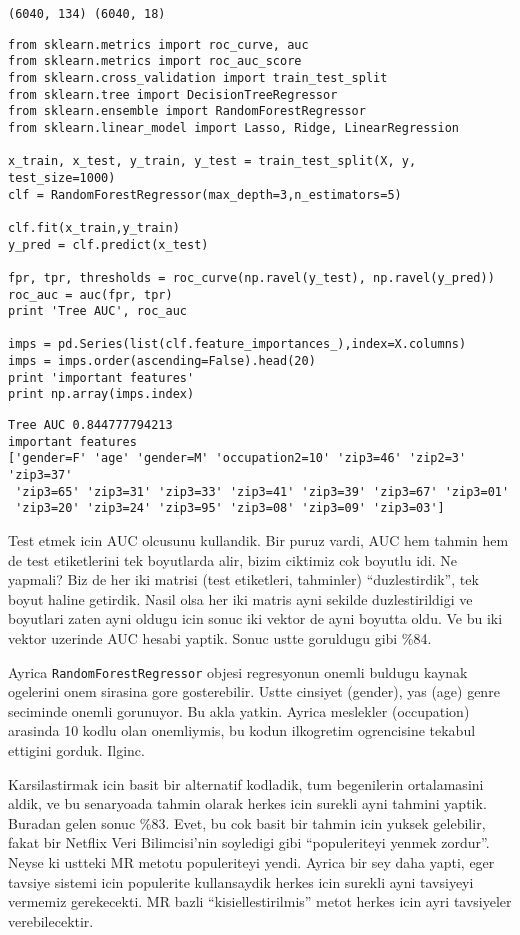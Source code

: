 \documentclass[12pt,fleqn]{article}\usepackage{../common}
\begin{document}
\begin{verbatim}
(6040, 134) (6040, 18)
\end{verbatim}

\begin{verbatim}
from sklearn.metrics import roc_curve, auc
from sklearn.metrics import roc_auc_score
from sklearn.cross_validation import train_test_split
from sklearn.tree import DecisionTreeRegressor
from sklearn.ensemble import RandomForestRegressor
from sklearn.linear_model import Lasso, Ridge, LinearRegression

x_train, x_test, y_train, y_test = train_test_split(X, y, test_size=1000)
clf = RandomForestRegressor(max_depth=3,n_estimators=5)

clf.fit(x_train,y_train)
y_pred = clf.predict(x_test)

fpr, tpr, thresholds = roc_curve(np.ravel(y_test), np.ravel(y_pred))
roc_auc = auc(fpr, tpr)
print 'Tree AUC', roc_auc

imps = pd.Series(list(clf.feature_importances_),index=X.columns)
imps = imps.order(ascending=False).head(20)
print 'important features'
print np.array(imps.index)
\end{verbatim}

\begin{verbatim}
Tree AUC 0.844777794213
important features
['gender=F' 'age' 'gender=M' 'occupation2=10' 'zip3=46' 'zip2=3' 'zip3=37'
 'zip3=65' 'zip3=31' 'zip3=33' 'zip3=41' 'zip3=39' 'zip3=67' 'zip3=01'
 'zip3=20' 'zip3=24' 'zip3=95' 'zip3=08' 'zip3=09' 'zip3=03']
\end{verbatim}

Test etmek icin AUC olcusunu kullandik. Bir puruz vardi, AUC hem tahmin hem
de test etiketlerini tek boyutlarda alir, bizim ciktimiz cok boyutlu
idi. Ne yapmali?  Biz de her iki matrisi (test etiketleri, tahminler)
``duzlestirdik'', tek boyut haline getirdik. Nasil olsa her iki matris ayni
sekilde duzlestirildigi ve boyutlari zaten ayni oldugu icin sonuc iki
vektor de ayni boyutta oldu. Ve bu iki vektor uzerinde AUC hesabi
yaptik. Sonuc ustte goruldugu gibi \%84.

Ayrica \verb!RandomForestRegressor! objesi regresyonun onemli buldugu
kaynak ogelerini onem sirasina gore gosterebilir. Ustte cinsiyet (gender),
yas (age) genre seciminde onemli gorunuyor. Bu akla yatkin. Ayrica
meslekler (occupation) arasinda 10 kodlu olan onemliymis, bu kodun
ilkogretim ogrencisine tekabul ettigini gorduk. Ilginc.

Karsilastirmak icin basit bir alternatif kodladik, tum begenilerin
ortalamasini aldik, ve bu senaryoada tahmin olarak herkes icin surekli ayni
tahmini yaptik. Buradan gelen sonuc \%83. Evet, bu cok basit bir tahmin
icin yuksek gelebilir, fakat bir Netflix Veri Bilimcisi'nin soyledigi gibi
``populeriteyi yenmek zordur''. Neyse ki ustteki MR metotu populeriteyi
yendi. Ayrica bir sey daha yapti, eger tavsiye sistemi icin populerite
kullansaydik herkes icin surekli ayni tavsiyeyi vermemiz gerekecekti. MR
bazli ``kisiellestirilmis'' metot herkes icin ayri tavsiyeler
verebilecektir.
\end{document}
